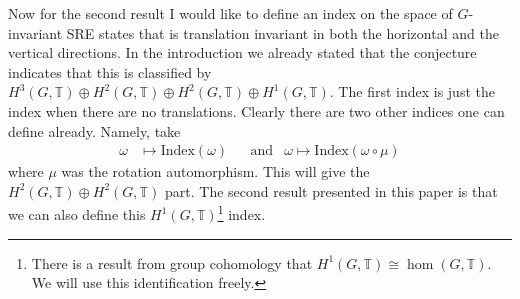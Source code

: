 \documentclass[12pt,a4paper,twoside]{article}
\newcommand{\TT}{\mathbb T}
\theoremstyle{definition}
\numberwithin{equation}{section}
\begin{document}
Now for the second result I would like to define an index on the space of $G$-invariant SRE states that is translation invariant in both the horizontal and the vertical directions. In the introduction we already stated that the conjecture indicates that this is classified by $H^3(G,\TT)\oplus H^2(G,\TT)\oplus H^2(G,\TT)\oplus H^1(G,\TT)$. The first index is just the index when there are no translations. Clearly there are two other indices one can define already. Namely, take
\begin{align}
	\omega&\mapsto \textrm{Index}(\omega)&&\text{and}&\omega\mapsto \textrm{Index}(\omega\circ\mu)
\end{align}
where $\mu$ was the rotation automorphism. This will give the $H^2(G,\TT)\oplus H^2(G,\TT)$ part. The second result presented in this paper is that we can also define this $H^1(G,\TT)$\footnote{There is a result from group cohomology that $H^1(G,\TT)\cong\hom(G,\TT)$. We will use this identification freely.} index.
\end{document}
